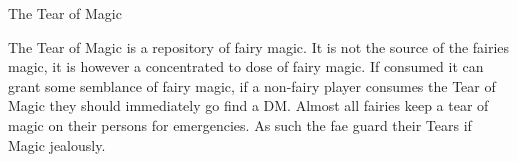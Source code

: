 \documentclass[blue]{guildcamp2}
\begin{document}
\name{\bTearOfMagic{}}
The Tear of Magic

The Tear of Magic is a repository of fairy magic. It is not the source of the fairies magic, it is however a concentrated to dose of fairy magic. If consumed it can grant some semblance of fairy magic, if a non-fairy player consumes the Tear of Magic they should immediately go find a DM. Almost all fairies keep a tear of magic on their persons for emergencies. As such the fae guard their Tears if Magic jealously.   
\end{document}
